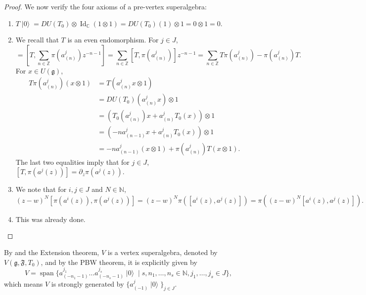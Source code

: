 \documentclass[a4paper, 12pt, reqno]{amsart}
\theoremstyle{remark}
\DeclareMathOperator{\Id}{Id}
\DeclareMathOperator{\vspan}{span}
\DeclareMathOperator{\vac}{|0\rangle}
\begin{document}
\begin{proof}
  We now verify the four axioms of a pre-vertex superalgebra:
  \begin{enumerate}
  \item $T\vac = DU(T_0)\otimes\Id_{\mathbb{C}}(1\otimes1) = DU(T_0)(1)\otimes1 = 0\otimes1 = 0$.
  \item We recall that $T$ is an even endomorphism.
    For $j \in J$,
    \begin{equation*}
      [T, \pi(a^j(z))] = \left[T, \sum_{n \in \mathbb{Z}}\pi(a^j_{(n)})z^{-n - 1}\right] = \sum_{n \in \mathbb{Z}}[T, \pi(a^j_{(n)})]z^{-n - 1} = \sum_{n \in \mathbb{Z}}T\pi(a^j_{(n)}) - \pi(a^j_{(n)})T.
    \end{equation*}
    For $x \in U(\mathfrak{g})$,
    \begin{align*}
      T\pi(a^j_{(n)})(x\otimes1) &= T(a^j_{(n)}x\otimes1) \\
                                 &= DU(T_0)(a^j_{(n)}x)\otimes1 \\
                                 &= (T_0(a^j_{(n)})x + a^j_{(n)}T_0(x))\otimes1 \\
                                 &= (-na^j_{(n - 1)}x + a^j_{(n)}T_0(x))\otimes1 \\
                                 &= -na^j_{(n - 1)}(x\otimes1) + \pi(a^j_{(n)})T(x\otimes 1).
    \end{align*}
    The last two equalities imply that for $j \in J$, $[T, \pi(a^j(z))] = \partial_z\pi(a^j(z))$.
  \item We note that for $i, j \in J$ and $N \in \mathbb{N}$,
    \begin{equation*}
      (z - w)^N[\pi(a^i(z)), \pi(a^j(z))] = (z - w)^N\pi([a^i(z), a^j(z)]) = \pi((z - w)^N[a^i(z), a^j(z)]).
    \end{equation*}
  \item This was already done. \qedhere
  \end{enumerate}
\end{proof}

By  and the Extension theorem, $V$ is a vertex superalgebra, denoted by $V(\mathfrak{g}, \mathfrak{F}, T_0)$, and by the PBW theorem, it is explicitly given by
\begin{equation}
  \label{eq:16}
  V = \vspan\{a^{j_1}_{(-n_1 - 1)}\dots a^{j_s}_{(-n_s - 1)}\vac \mid s, n_1, \dots, n_s \in \mathbb{N}, j_1, \dots, j_s \in J\},
\end{equation}
which means $V$ is strongly generated by $\{a^j_{(-1)}\vac\}_{j \in J}$.
\end{document}
